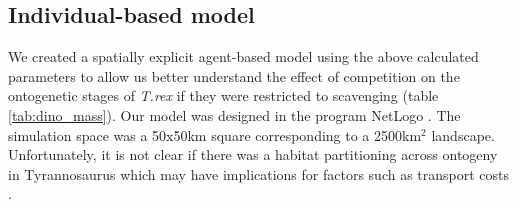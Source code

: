 
\begin{table}[H]
\small %
		\caption[Dinosaur carcass sizes] %
				{Mass categories for carcasses and allometric scaling of bone with body mass across carcass categories. The contribution column defines the percentage of carrion that is made up by a given species category.  
} 
		
		\label{tab:dino_mass}
	\end{table}


\begin{table}[H]
\small %
		\caption[Scavenger mass categories] %
				{Mass categories, gut capacities, walking speeds and daily energetic cost for the ontogenetic stages of \textit{T. rex} and its competitors as used in the individual-based model.  
} 
		
		\label{tab:scav_mass}
	\end{table}


\subsection{Individual-based model}
We created a spatially explicit agent-based model using the above calculated parameters to allow us better understand the effect of competition on the ontogenetic stages of \textit{T.rex} if they were restricted to scavenging (table \ref{tab:dino_mass}). Our model was designed in the program NetLogo \citep{tisue2004netlogo}. The simulation space was a 50x50km square corresponding to a 2500km$^2$ landscape. Unfortunately, it is not clear if there was a habitat partitioning across ontogeny in Tyrannosaurus which may have implications for factors such as transport costs \citep{ruxton2014energetic}. 


